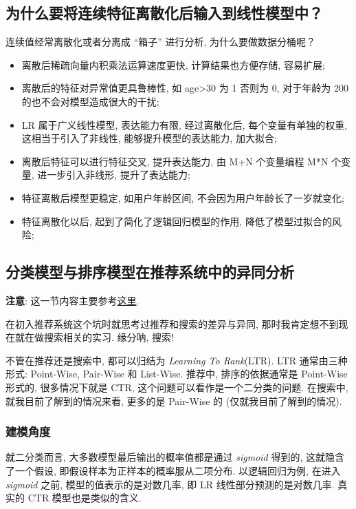 \subsection{为什么要将连续特征离散化后输入到线性模型中？}
连续值经常离散化或者分离成 “箱子” 进行分析, 为什么要做数据分桶呢？
\begin{itemize}
	\item 离散后稀疏向量内积乘法运算速度更快, 计算结果也方便存储, 容易扩展; 
	
	\item 离散后的特征对异常值更具鲁棒性, 如 age>30 为 1 否则为 0, 对于年龄为 200 的也不会对模型造成很大的干扰; 
	
	\item LR 属于广义线性模型, 表达能力有限, 经过离散化后, 每个变量有单独的权重, 这相当于引入了非线性, 能够提升模型的表达能力, 加大拟合; 
	
	\item 离散后特征可以进行特征交叉, 提升表达能力, 由 M+N 个变量编程 M*N 个变量, 进一步引入非线形, 提升了表达能力; 
	
	\item 特征离散后模型更稳定, 如用户年龄区间, 不会因为用户年龄长了一岁就变化; 
	
	\item 特征离散化以后, 起到了简化了逻辑回归模型的作用, 降低了模型过拟合的风险; 
\end{itemize}


\subsection{分类模型与排序模型在推荐系统中的异同分析}
\textbf{注意}: 这一节内容主要参考\href{https://zhuanlan.zhihu.com/p/502638808?utm_source=wechat_session&utm_medium=social&utm_oi=797192809567354880&utm_campaign=shareopn}{这里}.

在初入推荐系统这个坑时就思考过推荐和搜索的差异与异同, 那时我肯定想不到现在就在做搜索相关的实习. 缘分呐, 搜索!

不管在推荐还是搜索中, 都可以归结为 \textit{Learning To Rank}(LTR). LTR 通常由三种形式: Point-Wise, Pair-Wise 和 List-Wise. 推荐中, 排序的依据通常是 Point-Wise 形式的, 很多情况下就是 CTR, 这个问题可以看作是一个二分类的问题. 在搜索中, 就我目前了解到的情况来看, 更多的是 Pair-Wise 的 (仅就我目前了解到的情况).

\subsubsection{建模角度}
就二分类而言, 大多数模型最后输出的概率值都是通过 \textit{sigmoid} 得到的, 这就隐含了一个假设, 即假设样本为正样本的概率服从二项分布. 以逻辑回归为例, 在进入 \textit{sigmoid} 之前, 模型的值表示的是对数几率, 即 LR 线性部分预测的是对数几率. 真实的 CTR 模型也是类似的含义.

